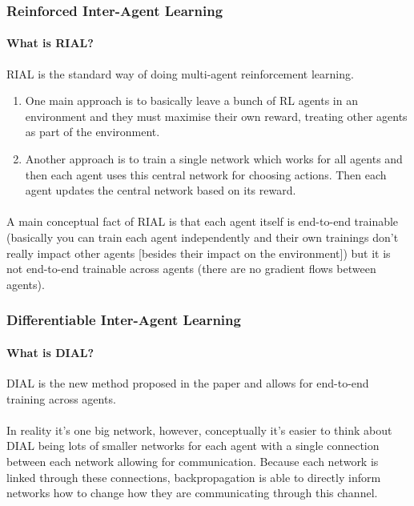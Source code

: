 \documentclass{article}
\begin{document}
    \subsubsection{Reinforced Inter-Agent Learning}

    \paragraph{What is RIAL?} RIAL is the standard way of doing multi-agent reinforcement learning. 
    \begin{enumerate}
        \item One main approach is to basically leave a bunch of RL agents in an environment and they must maximise their own reward, treating other agents as part of the environment.
        \item Another approach is to train a single network which works for all agents and then each agent uses this central network for choosing actions. Then each agent updates the central network based on its reward.
    \end{enumerate}

    \paragraph{} A main conceptual fact of RIAL is that each agent itself is end-to-end trainable (basically you can train each agent independently and their own trainings don't really impact other agents [besides their impact on the environment]) but it is not end-to-end trainable across agents (there are no gradient flows between agents).


    \subsubsection{Differentiable Inter-Agent Learning}

    \paragraph{What is DIAL?} DIAL is the new method proposed in the paper and allows for end-to-end training across agents. 
   
    \paragraph{} In reality it's one big network, however, conceptually it's easier to think about DIAL being lots of smaller networks for each agent with a single connection between each network allowing for communication. Because each network is linked through these connections, backpropagation is able to directly inform networks how to change how they are communicating through this channel.
\end{document}
